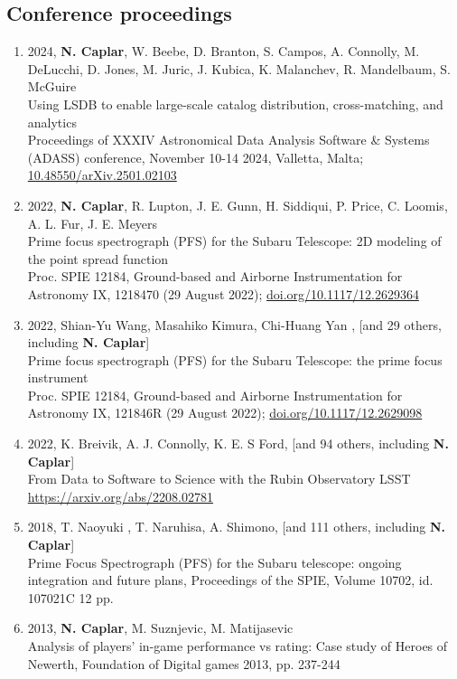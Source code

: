 \documentclass[11pt,letterpaper]{article}
\begin{document}
\subsection*{Conference proceedings}
\begin{enumerate}

\item 2024, \textbf{N. Caplar}, W. Beebe, D. Branton, S. Campos, A. Connolly, M. DeLucchi, D. Jones, M. Juric, J. Kubica, K. Malanchev, R. Mandelbaum, S. McGuire\\
Using LSDB to enable large-scale catalog distribution, cross-matching, and analytics\\
 Proceedings of XXXIV Astronomical Data Analysis Software \& Systems (ADASS) conference, November 10-14 2024, Valletta, Malta;  \href{https://ui.adsabs.harvard.edu/link_gateway/2025arXiv250102103C/doi:10.48550/arXiv.2501.02103}{10.48550/arXiv.2501.02103}

\item 2022, \textbf{N. Caplar}, R. Lupton, J. E. Gunn, H. Siddiqui, P. Price, C. Loomis, A. L. Fur, J. E. Meyers\\
Prime focus spectrograph (PFS) for the Subaru Telescope: 2D modeling of the point spread function\\
Proc. SPIE 12184, Ground-based and Airborne Instrumentation for Astronomy IX, 1218470 (29 August 2022);  \href{https://doi.org/10.1117/12.2629364}{doi.org/10.1117/12.2629364}

\item 2022, Shian-Yu Wang, Masahiko Kimura, Chi-Huang Yan , [and 29 others, including \textbf{N. Caplar}] \\
Prime focus spectrograph (PFS) for the Subaru Telescope: the prime focus instrument \\ 
Proc. SPIE 12184, Ground-based and Airborne Instrumentation for Astronomy IX, 121846R (29 August 2022);  \href{https://doi.org/10.1117/12.2629098}{doi.org/10.1117/12.2629098}

\item 2022, K. Breivik, A. J. Connolly, K. E. S Ford,  [and 94 others, including  \textbf{N. Caplar}]   \\
From Data to Software to Science with the Rubin Observatory LSST \\
\href{arXiv:2208.02781}{https://arxiv.org/abs/2208.02781} 

\item 2018, T. Naoyuki , T. Naruhisa,  A. Shimono, [and 111 others, including  \textbf{N. Caplar}] \\ Prime Focus Spectrograph (PFS) for the Subaru telescope: ongoing integration and future plans, Proceedings of the SPIE, Volume 10702, id. 107021C 12 pp. 

\item 2013,  \textbf{N. Caplar}, M. Suznjevic, M. Matijasevic  \\ Analysis of players' in-game performance vs rating: Case study of Heroes of Newerth, Foundation of Digital games 2013,  pp. 237-244  

\end{enumerate}

\newpage 
\end{document}
